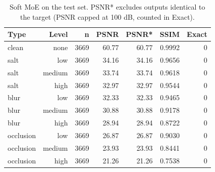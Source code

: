 \begin{table}[t]
\centering
\caption{Soft MoE on the test set. PSNR* excludes outputs identical to the target (PSNR capped at 100 dB, counted in Exact).}
\label{tab:task3_by_type_level}
\begin{tabular}{lrrrrrr}
\toprule
Type & Level & n & PSNR & PSNR* & SSIM & Exact \\
\midrule
clean & none & 3669 & 60.77 & 60.77 & 0.9992 & 0 \\
salt & low & 3669 & 34.16 & 34.16 & 0.9656 & 0 \\
salt & medium & 3669 & 33.74 & 33.74 & 0.9618 & 0 \\
salt & high & 3669 & 32.97 & 32.97 & 0.9544 & 0 \\
blur & low & 3669 & 32.33 & 32.33 & 0.9465 & 0 \\
blur & medium & 3669 & 30.88 & 30.88 & 0.9178 & 0 \\
blur & high & 3669 & 28.94 & 28.94 & 0.8722 & 0 \\
occlusion & low & 3669 & 26.87 & 26.87 & 0.9030 & 0 \\
occlusion & medium & 3669 & 23.93 & 23.93 & 0.8441 & 0 \\
occlusion & high & 3669 & 21.26 & 21.26 & 0.7538 & 0 \\
\bottomrule
\end{tabular}
\end{table}
